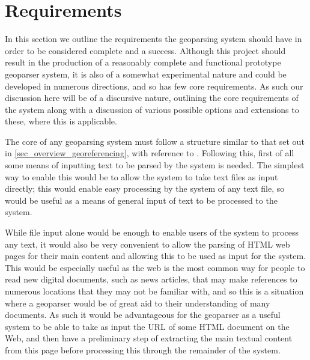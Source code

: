 \documentclass[12pt, a4paper]{report}
\begin{document}
\section{Requirements}


In this section we outline the requirements the geoparsing system should have in order to be considered complete and a success. Although this project should result in the production of a reasonably complete and functional prototype geoparser system, it is also of a somewhat experimental nature and could be developed in numerous directions, and so has few core requirements. As such our discussion here will be of a discursive nature, outlining the core requirements of the system along with a discussion of various possible options and extensions to these, where this is applicable. 



The core of any geoparsing system must follow a structure similar to that set out in \ref{sec_overview_georeferencing}, with reference to \citet{hill2006}. Following this, first of all some means of inputting text to be parsed by the system is needed. The simplest way to enable this would be to allow the system to take text files as input directly; this would enable easy processing by the system of any text file, so would be useful as a means of general input of text to be processed to the system.

While file input alone would be enough to enable users of the system to process any text, it would also be very convenient to allow the parsing of HTML web pages for their main content and allowing this to be used as input for the system. This would be especially useful as the web is the most common way for people to read new digital documents, such as news articles, that may make references to numerous locations that they may not be familiar with, and so this is a situation where a geoparser would be of great aid to their understanding of many documents. As such it would be advantageous for the geoparser as a useful system to be able to take as input the URL of some HTML document on the Web, and then have a preliminary step of extracting the main textual content from this page before processing this through the remainder of the system.
\end{document}
